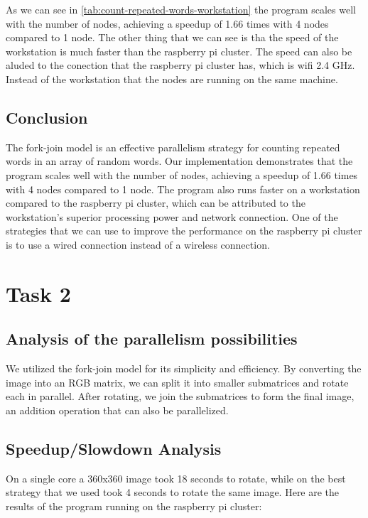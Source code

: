 \documentclass[12pt]{article}
\begin{document}
As we can see in \ref{tab:count-repeated-words-workstation} the program scales well with the number of nodes, achieving a speedup of 1.66 times with 4 nodes compared to 1 node. The other thing that we can see is tha the speed of the workstation is much faster than the raspberry pi cluster. The speed can also be aluded to the conection that the raspberry pi cluster has, which is wifi 2.4 GHz. Instead of the workstation that the nodes are running on the same machine.

\subsection{Conclusion}

The fork-join model is an effective parallelism strategy for counting repeated words in an array of random words. Our implementation demonstrates that the program scales well with the number of nodes, achieving a speedup of 1.66 times with 4 nodes compared to 1 node. The program also runs faster on a workstation compared to the raspberry pi cluster, which can be attributed to the workstation's superior processing power and network connection. One of the strategies that we can use to improve the performance on the raspberry pi cluster is to use a wired connection instead of a wireless connection.

\section{Task 2}

\subsection{Analysis of the parallelism possibilities}

We utilized the fork-join model for its simplicity and efficiency. By converting the image into an RGB matrix, we can split it into smaller submatrices and rotate each in parallel. After rotating, we join the submatrices to form the final image, an addition operation that can also be parallelized.
\subsection{Speedup/Slowdown Analysis}

On a single core a 360x360 image took 18 seconds to rotate, while on the best strategy that we used took 4 seconds to rotate the same image. Here are the results of the program running on the raspberry pi cluster:
\end{document}
